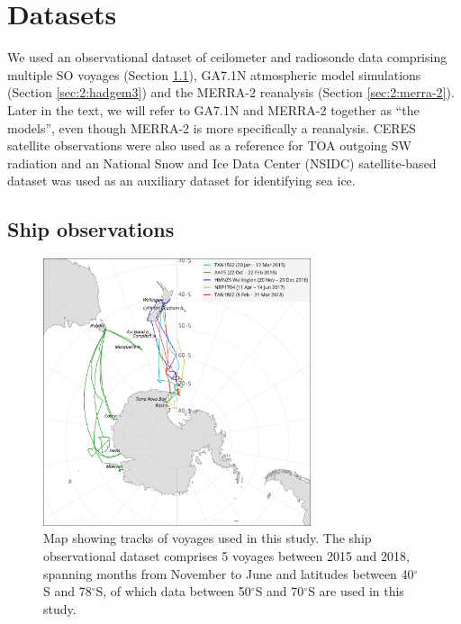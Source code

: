 \section{Datasets}
\label{sec:2:datasets}

We used an observational dataset of ceilometer and radiosonde data comprising
multiple SO voyages (Section \ref{sec:2:ship-observations}), GA7.1N atmospheric
model simulations (Section \ref{sec:2:hadgem3}) and the MERRA-2 reanalysis
(Section \ref{sec:2:merra-2}). Later in the text, we will refer to GA7.1N and
MERRA-2 together as ``the models'', even though MERRA-2 is more specifically a
reanalysis. CERES satellite observations \citep{wielicki1996} were also used as
a reference for TOA outgoing SW radiation and an National Snow and Ice Data
Center (NSIDC) satellite-based dataset \citep{maslanik1999} was used as an
auxiliary dataset for identifying sea ice.

\subsection{Ship observations}
\label{sec:2:ship-observations}

\begin{figure}[t]
\centering
\includegraphics[width=0.7\textwidth]{chapter2/fig/map_rev2.pdf}
\caption[Map showing tracks of voyages]{
Map showing tracks of voyages used in this study. The ship observational dataset
comprises 5 voyages between 2015 and 2018, spanning months from November to June
and latitudes between 40$^\circ$S and 78$^\circ$S, of which data between
50$^\circ$S and 70$^\circ$S are used in this study.
}
\label{fig:2:map}
\end{figure}


